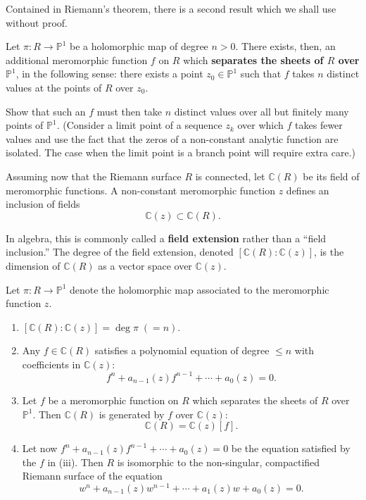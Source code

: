 \documentclass[12pt]{article}
\begin{document}
\medskip
Contained in Riemann’s theorem, there is a second result which we shall use without proof.

\begin{proposition}
Let $\pi : R \to \mathbb{P}^1$ be a holomorphic map of degree $n > 0$.  
There exists, then, an additional meromorphic function $f$ on $R$ which \textbf{separates the sheets of $R$ over $\mathbb{P}^1$}, in the following sense: there exists a point $z_0 \in \mathbb{P}^1$ such that $f$ takes $n$ distinct values at the points of $R$ over $z_0$.
\end{proposition}

\begin{exercise}
Show that such an $f$ must then take $n$ distinct values over all but finitely many points of $\mathbb{P}^1$.  
(Consider a limit point of a sequence $z_k$ over which $f$ takes fewer values and use the fact that the zeros of a non-constant analytic function are isolated.  
The case when the limit point is a branch point will require extra care.)
\end{exercise}

Assuming now that the Riemann surface $R$ is connected, let $\mathbb{C}(R)$ be its field of meromorphic functions.  
A non-constant meromorphic function $z$ defines an inclusion of fields
\[
\mathbb{C}(z) \subset \mathbb{C}(R).
\]

In algebra, this is commonly called a \textbf{field extension} rather than a “field inclusion.”  
The degree of the field extension, denoted $[\mathbb{C}(R):\mathbb{C}(z)]$, is the dimension of $\mathbb{C}(R)$ as a vector space over $\mathbb{C}(z)$.


\begin{theorem}
    Let $\pi : R \to \mathbb{P}^1$ denote the holomorphic map associated to the meromorphic function $z$.
\begin{enumerate}
    \item $[\mathbb{C}(R):\mathbb{C}(z)] = \deg \pi \;(= n)$.
    \item Any $f \in \mathbb{C}(R)$ satisfies a polynomial equation of degree $\le n$ with coefficients in $\mathbb{C}(z)$:
    \[
    f^n + a_{n-1}(z)f^{n-1} + \cdots + a_0(z) = 0.
    \]
    \item Let $f$ be a meromorphic function on $R$ which separates the sheets of $R$ over $\mathbb{P}^1$.  
    Then $\mathbb{C}(R)$ is generated by $f$ over $\mathbb{C}(z)$:
    \[
    \mathbb{C}(R) = \mathbb{C}(z)[f].
    \]
    \item Let now $f^n + a_{n-1}(z)f^{n-1} + \cdots + a_0(z) = 0$ be the equation satisfied by the $f$ in (iii).  
    Then $R$ is isomorphic to the non-singular, compactified Riemann surface of the equation
    \[
    w^n + a_{n-1}(z)w^{n-1} + \cdots + a_1(z)w + a_0(z) = 0.
    \]
\end{enumerate}
\end{theorem}
\end{document}
